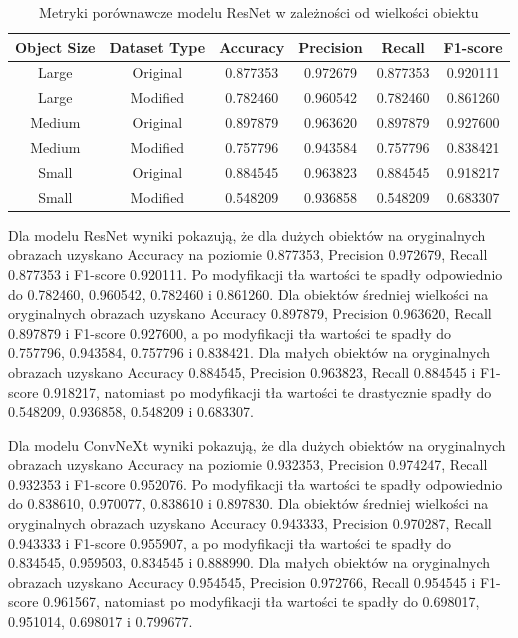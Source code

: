 \begin{table}
	\centering
	\begin{tabular}{|c|c|c|c|c|c|}
		\hline
		\textbf{Object Size} & \textbf{Dataset Type} & \textbf{Accuracy} & \textbf{Precision} & \textbf{Recall} & \textbf{F1-score} \\
		\hline
		Large & Original & 0.877353 & 0.972679 & 0.877353 & 0.920111 \\
		\hline
		Large & Modified & 0.782460 & 0.960542 & 0.782460 & 0.861260 \\
		\hline
		Medium & Original & 0.897879 & 0.963620 & 0.897879 & 0.927600 \\
		\hline
		Medium & Modified & 0.757796 & 0.943584 & 0.757796 & 0.838421 \\
		\hline
		Small & Original & 0.884545 & 0.963823 & 0.884545 & 0.918217 \\
		\hline
		Small & Modified & 0.548209 & 0.936858 & 0.548209 & 0.683307 \\
		\hline
	\end{tabular}
	\caption{Metryki porównawcze modelu ResNet w zależności od wielkości obiektu}
	\label{tab:resnet_object_size_metrics}
\end{table}

Dla modelu ResNet wyniki pokazują, że dla dużych obiektów na oryginalnych obrazach uzyskano Accuracy na poziomie 0.877353, Precision 0.972679, 
Recall 0.877353 i F1-score 0.920111. Po modyfikacji tła wartości te spadły odpowiednio do 0.782460, 0.960542, 0.782460 i 0.861260. Dla obiektów 
średniej wielkości na oryginalnych obrazach uzyskano Accuracy 0.897879, Precision 0.963620, Recall 0.897879 i F1-score 0.927600, a po modyfikacji 
tła wartości te spadły do 0.757796, 0.943584, 0.757796 i 0.838421. Dla małych obiektów na oryginalnych obrazach uzyskano Accuracy 0.884545, 
Precision 0.963823, Recall 0.884545 i F1-score 0.918217, natomiast po modyfikacji tła wartości te drastycznie spadły do 0.548209, 0.936858, 
0.548209 i 0.683307.

Dla modelu ConvNeXt wyniki pokazują, że dla dużych obiektów na oryginalnych obrazach uzyskano Accuracy na poziomie 0.932353, Precision 0.974247, 
Recall 0.932353 i F1-score 0.952076. Po modyfikacji tła wartości te spadły odpowiednio do 0.838610, 0.970077, 0.838610 i 0.897830. Dla obiektów 
średniej wielkości na oryginalnych obrazach uzyskano Accuracy 0.943333, Precision 0.970287, Recall 0.943333 i F1-score 0.955907, a po modyfikacji 
tła wartości te spadły do 0.834545, 0.959503, 0.834545 i 0.888990. Dla małych obiektów na oryginalnych obrazach uzyskano Accuracy 0.954545, 
Precision 0.972766, Recall 0.954545 i F1-score 0.961567, natomiast po modyfikacji tła wartości te spadły do 0.698017, 0.951014, 0.698017 i 0.799677.

